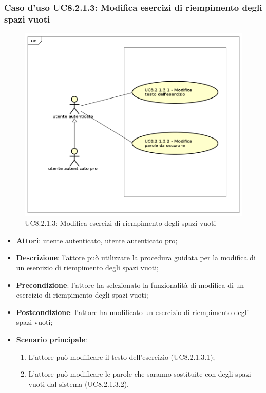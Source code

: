\subsubsection{Caso d'uso UC8.2.1.3: Modifica esercizi di riempimento degli spazi vuoti}
	\label{UC8.2.1.3}
	\begin{figure}[h]
		\centering
			\includegraphics[scale=0.45,keepaspectratio]{UML/UC8_2_1_3.png}
		\caption{UC8.2.1.3: Modifica esercizi di riempimento degli spazi vuoti}
	\end{figure}
	\FloatBarrier
	\begin{itemize}
		\item
			\textbf{Attori}: utente autenticato, utente autenticato pro;
		\item		
			\textbf{Descrizione}: l'attore può utilizzare la procedura guidata per la modifica di un esercizio di riempimento degli spazi vuoti;
		\item
			\textbf{Precondizione}: l'attore ha selezionato la funzionalità di modifica di un esercizio di riempimento degli spazi vuoti; 
		\item
			\textbf{Postcondizione}: l'attore ha modificato un esercizio di riempimento degli spazi vuoti;
		\item
			\textbf{Scenario principale}:
	       		\begin{enumerate}
	       			\item
	       			L'attore può modificare il testo dell'esercizio (UC8.2.1.3.1);
	       			\item
	       			L'attore può modificare le parole che saranno sostituite con degli spazi vuoti dal sistema (UC8.2.1.3.2).
	 			\end{enumerate}
	\end{itemize}
	

